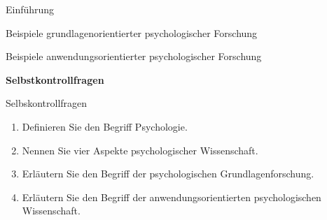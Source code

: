 \documentclass[
  8pt,
  ignorenonframetext,
]{beamer}
\providecommand{\tightlist}{%
  \setlength{\itemsep}{0pt}\setlength{\parskip}{0pt}}
\begin{document}
\begin{frame}{}
\protect\hypertarget{section-6}{}
\large

Einführung

Beispiele grundlagenorientierter psychologischer Forschung

Beispiele anwendungsorientierter psychologischer Forschung

\textbf{Selbstkontrollfragen}
\end{frame}

\begin{frame}{Selbskontrollfragen}
\protect\hypertarget{selbskontrollfragen}{}
\small
{}

\begin{enumerate}
\tightlist
\item
  Definieren Sie den Begriff Psychologie.
\item
  Nennen Sie vier Aspekte psychologischer Wissenschaft.
\item
  Erläutern Sie den Begriff der psychologischen Grundlagenforschung.
\item
  Erläutern Sie den Begriff der anwendungsorientierten psychologischen
  Wissenschaft.
\end{enumerate}
\end{frame}
\end{document}
